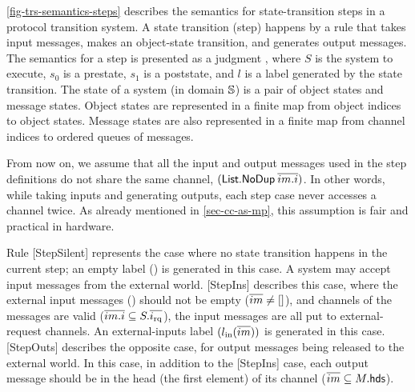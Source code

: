 \autoref{fig-trs-semantics-steps} describes the semantics for state-transition steps in a protocol transition system.
A state transition (step) happens by a rule that takes input messages, makes an object-state transition, and generates output messages.
The semantics for a step is presented as a judgment , where $S$ is the system to execute, $s_0$ is a prestate, $s_1$ is a poststate, and $l$ is a label generated by the state transition.
The state of a system (in domain $\mathbb{S}{}$) is a pair of object states and message states.
Object states are represented in a finite map from object indices to object states.
Message states are also represented in a finite map from channel indices to ordered queues of messages.

From now on, we assume that all the input and output messages used in the step definitions do not share the same channel, \ie{} $(\textsf{List.NoDup}\: \overline{im.i})$.
In other words, while taking inputs and generating outputs, each step case never accesses a channel twice.
As already mentioned in \autoref{sec-cc-as-mp}, this assumption is fair and practical in hardware.

Rule [StepSilent] represents the case where no state transition happens in the current step; an empty label (\lblEmpty{}) is generated in this case.
A system may accept input messages from the external world.
[StepIns] describes this case, where the external input messages () should not be empty ($\overline{im} \neq \lbrack\rbrack$), and channels of the messages are valid ($\overline{im.i} \subseteq S.\overline{i_{\textrm{rq}}}$), \ie{} the input messages are all put to external-request channels.
An external-inputs label $(l_{\textrm{in}}(\overline{im}))$ is generated in this case.
[StepOuts] describes the opposite case, for output messages being released to the external world.
In this case, in addition to the [StepIns] case, each output message should be in the head (the first element) of its channel ($\overline{im} \subseteq M.\textsf{hds}$).

